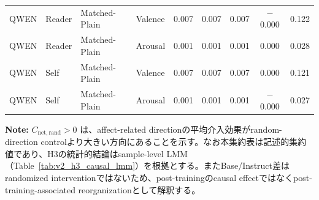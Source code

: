 \begin{table}[htbp]
\begin{tabular}{llll ccccc}
QWEN       & Reader   & Matched-Plain    & Valence  & 0.007      & 0.007      & 0.007      & $-$0.000           & 0.122        \\
QWEN       & Reader   & Matched-Plain    & Arousal  & 0.001      & 0.001      & 0.001      & 0.000              & 0.028        \\
QWEN       & Self     & Matched-Plain    & Valence  & 0.007      & 0.007      & 0.007      & 0.000              & 0.121        \\
QWEN       & Self     & Matched-Plain    & Arousal  & 0.001      & 0.001      & 0.001      & $-$0.000           & 0.027        \\
\bottomrule
\end{tabular}
\vspace{1ex}
\begin{minipage}{\linewidth}
\footnotesize
\textbf{Note:} $C_{\mathrm{net,rand}}>0$ は、affect-related directionの平均介入効果がrandom-direction controlより大きい方向にあることを示す。なお本集約表は記述的集約値であり、H3の統計的結論はsample-level LMM（Table~\ref{tab:v2_h3_causal_lmm}）を根拠とする。またBase/Instruct差はrandomized interventionではないため、post-trainingのcausal effectではなくpost-training-associated reorganizationとして解釈する。
\end{minipage}
\end{table}